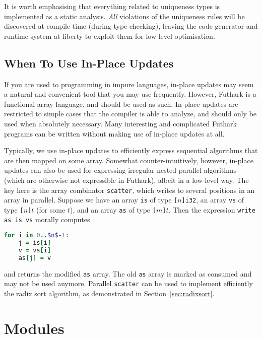 \documentclass[oneside,11pt]{book}
\begin{document}
It is worth emphasising that everything related to uniqueness types is
implemented as a static analysis.  \textit{All} violations of the
uniqueness rules will be discovered at compile time (during
type-checking), leaving the code generator and runtime system at
liberty to exploit them for low-level optimisation.

\subsection{When To Use In-Place Updates}

If you are used to programming in impure languages, in-place updates
may seem a natural and convenient tool that you may use frequently.
However, Futhark is a functional array language, and should be used as
such.  In-place updates are restricted to simple cases that the
compiler is able to analyze, and should only be used when absolutely
necessary.  Many interesting and complicated Futhark programs can be
written without making use of in-place updates at all.

Typically, we use in-place updates to efficiently express sequential
algorithms that are then mapped on some array.  Somewhat
counter-intuitively, however, in-place updates can also be used for
expressing irregular nested parallel algorithms (which are otherwise
not expressible in Futhark), albeit in a low-level way.  The key here
is the array combinator \texttt{scatter}, which writes to several
positions in an array in parallel.  Suppose we have an array
\texttt{is} of type \texttt{[$n$]i32}, an array \texttt{vs} of type
\texttt{[$n$]$t$} (for some \texttt{$t$}), and an array \texttt{as} of
type \texttt{[$m$]$t$}. Then the expression \texttt{write as is vs}
morally computes

\begin{lstlisting}[language=ruby,mathescape=true]
  for i in 0..$n$-1:
    j = is[i]
    v = vs[i]
    as[j] = v
\end{lstlisting}

\noindent
and returns the modified \texttt{as} array.  The old \texttt{as} array
is marked as consumed and may not be used anymore.  Parallel
\texttt{scatter} can be used to implement efficiently the radix sort algorithm, as demonstrated in Section~\ref{sec:radixsort}.

\section{Modules}
\label{sec:modules}
\end{document}
